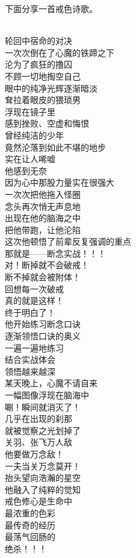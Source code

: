 下面分享一首戒色诗歌。

\begin{poem}[万念敌]
    \begin{multicols}{2}
        \centering~\\
        轮回中宿命的对决 \\ 一次次倒在了心魔的铁蹄之下 \\ 沦为了疯狂的撸囚 \\ 不顾一切地掏空自己 \\ 眼中的纯净光辉逐渐暗淡 \\ 耷拉着眼皮的猥琐男 \\ 浮现在镜子里 \\ 感到挫败、空虚和悔恨 \\ 曾经纯洁的少年 \\ 竟然沦落到如此不堪的地步 \\ 实在让人唏嘘 \\ 他感到无奈 \\ 因为心中那股力量实在很强大 \\ 一次次把他拖入怪圈 \\ 念头再次悄无声息地 \\ 出现在他的脑海之中 \\ 把他带跑，让他沦陷 \\ 这次他顿悟了前辈反复强调的重点 \\ 那就是——断念实战！！！ \\ 对！断掉就不会破戒！ \\ 断不掉就会被附体！ \\ 回想每一次破戒 \\ 真的就是这样！ \\ 终于明白了！ \\ 他开始练习断念口诀 \\ 逐渐领悟口诀的奥义 \\ 一遍一遍地练习 \\ 结合实战体会 \\ 领悟越来越深 \\ 某天晚上，心魔不请自来 \\ 一幅图像浮现在脑海中 \\ 唰！瞬间就消灭了！ \\ 几乎在出现的刹那 \\ 就被觉察之光划掉了 \\ 关羽、张飞万人敌 \\ 他要做万念敌！ \\ 一夫当关万念莫开！ \\ 抬头望向浩瀚的星空 \\ 他融入了纯粹的觉知 \\ 戒色修心是生命中 \\ 最浓重的色彩 \\ 最传奇的经历 \\ 最荡气回肠的 \\ 绝杀！！！
    \end{multicols}
\end{poem}

